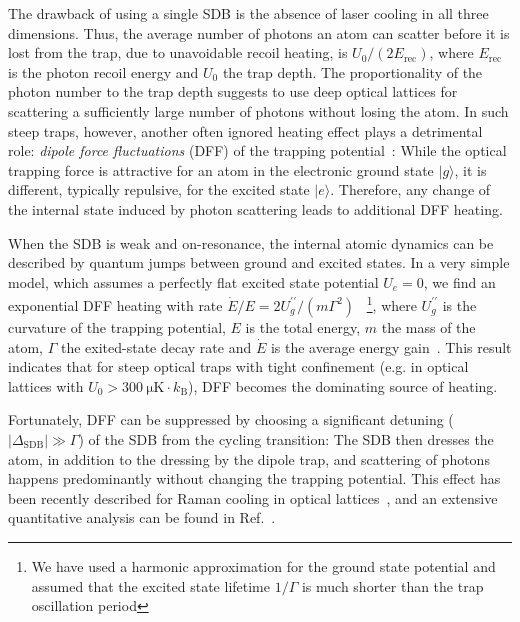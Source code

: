\documentclass[aps,prl,twocolumn,english,showpacs]{revtex4-1}
\begin{document}
The drawback of using a single SDB is the absence of laser cooling in all three dimensions. Thus, the average number of photons an atom can scatter before it is lost from the trap, due to unavoidable recoil heating, is $U_0/(2 E_\text{rec})$, where $E_\text{rec}$ is the photon recoil energy and $U_0$ the trap depth. The proportionality of the photon number to the trap depth suggests to use deep optical lattices for scattering a sufficiently large number of photons without losing the atom. In such steep traps, however, another often ignored heating effect plays a detrimental role: \textit{dipole force fluctuations} (DFF) of the trapping potential~\cite{dalibard1985,cheuk2015quantum}: While the optical trapping force is attractive for an atom in the electronic ground state $\vert g \rangle$, it is different, typically repulsive, for the excited state $\vert e \rangle$. Therefore, any change of the internal state induced by photon scattering leads to additional DFF heating. 

When the SDB is weak and on-resonance, the internal atomic dynamics can be described by quantum jumps between ground and excited states. In a very simple model, which assumes a perfectly flat excited state potential $U_e = 0$, we find an exponential DFF heating with rate $\dot E/E = 2 U_{g}^{\prime \prime}/(m\Gamma ^{2})$ ~\footnote{We have used a
harmonic approximation for the ground state potential and assumed that the excited state lifetime $1/\Gamma$ is much shorter than the trap oscillation period}, where $U_{g}^{\prime \prime}$ is the curvature of the trapping potential, $E$ is the total energy, $m$ the mass of the atom, $\Gamma$ the exited-state decay rate and $\dot E$ is the average energy gain~\cite{LongPaper}. This result indicates that for steep optical traps with tight confinement (e.g. in optical lattices with $U_0>\SI{300}{\micro\kelvin} \cdot k_\text{B}$), DFF becomes the dominating source of heating.

Fortunately, DFF can be suppressed by choosing a significant detuning ($|\Delta_\text{SDB}|\gg\Gamma$) of the SDB from the cycling transition: The SDB then dresses the atom, in addition to the dressing by the dipole trap, and scattering of photons happens predominantly without changing the trapping potential. This effect has been recently described for Raman cooling in optical lattices~\cite{cheuk2015quantum}, and an extensive quantitative analysis can be found in Ref.~\cite{LongPaper}.
\end{document}
